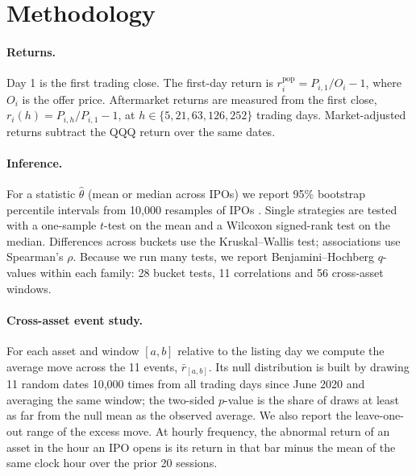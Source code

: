 \documentclass[11pt]{article}
\begin{document}


\section{Methodology}

\paragraph{Returns.} Day 1 is the first trading close. The first-day return is $r^{\text{pop}}_i = P_{i,1}/O_i - 1$, where $O_i$ is the offer price. Aftermarket returns are measured from the first close, $r_{i}(h) = P_{i,h}/P_{i,1} - 1$, at $h \in \{5, 21, 63, 126, 252\}$ trading days. Market-adjusted returns subtract the QQQ return over the same dates.

\paragraph{Inference.} For a statistic $\hat\theta$ (mean or median across IPOs) we report 95\% bootstrap percentile intervals from 10,000 resamples of IPOs \citep{efron1993}. Single strategies are tested with a one-sample $t$-test on the mean and a Wilcoxon signed-rank test on the median. Differences across buckets use the Kruskal--Wallis test; associations use Spearman's $\rho$. Because we run many tests, we report Benjamini--Hochberg $q$-values \citep{benjamini1995} within each family: 28 bucket tests, 11 correlations and 56 cross-asset windows.

\paragraph{Cross-asset event study.} For each asset and window $[a,b]$ relative to the listing day we compute the average move across the 11 events, $\bar r_{[a,b]}$. Its null distribution is built by drawing 11 random dates 10,000 times from all trading days since June 2020 and averaging the same window; the two-sided $p$-value is the share of draws at least as far from the null mean as the observed average. We also report the leave-one-out range of the excess move. At hourly frequency, the abnormal return of an asset in the hour an IPO opens is its return in that bar minus the mean of the same clock hour over the prior 20 sessions.
\end{document}
